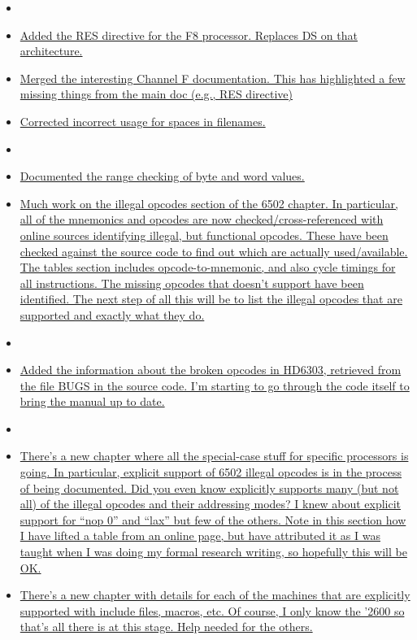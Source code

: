 \begin{itemize}
\item[]
\item \hyperref[changelog:20200906res]{Added the RES directive for the F8 processor. Replaces DS on that architecture.}
\item \hyperref[changelog:20200906f8]{Merged the interesting Channel F documentation. This has highlighted a few missing things from the main doc (e.g., RES directive)}
\item \hyperref[changelog:20200906spaces]{Corrected incorrect usage for spaces in filenames.}
\item[]
\item \hyperref[changelog:20200905range]{Documented the range checking of byte and word values.}
\item \hyperref[changelog:20200904illegal]{Much work on the illegal opcodes section of the 6502 chapter. In particular, all of the mnemonics and opcodes are now checked/cross-referenced with online sources identifying illegal, but functional opcodes. These have been checked against the \dasm source code to find out which are actually used/available. The tables section includes opcode-to-mnemonic, and also cycle timings for all instructions. The missing opcodes that \dasm doesn't support have been identified. The next step of all this will be to list the illegal opcodes that are supported and exactly what they do.}
\item[]
\item \hyperref[changelog:20200903bug]{Added the information about the broken opcodes in HD6303, retrieved from the file BUGS in the source code. I'm starting to go through the code itself to bring the manual up to date.}
\item[]
\item \hyperref[changelog20200901_nop3]{There's a new chapter where all the special-case stuff for specific processors is going. In particular, explicit support of 6502 illegal opcodes is in the process of being documented. Did you even know \dasm explicitly supports many (but not all) of the illegal opcodes and their addressing modes? I knew about explicit support for ``nop 0'' and ``lax'' but few of the others. Note in this section how I have lifted a table from an online page, but have attributed it as I was taught when I was doing my formal research writing, so hopefully this will be OK.}
\item \hyperref[changelog20200901_nop3]{There's a new chapter with details for each of the machines that are explicitly supported with include files, macros, etc. Of course, I only know the '2600 so that's all there is at this stage. Help needed for the others.}

\end{itemize}
